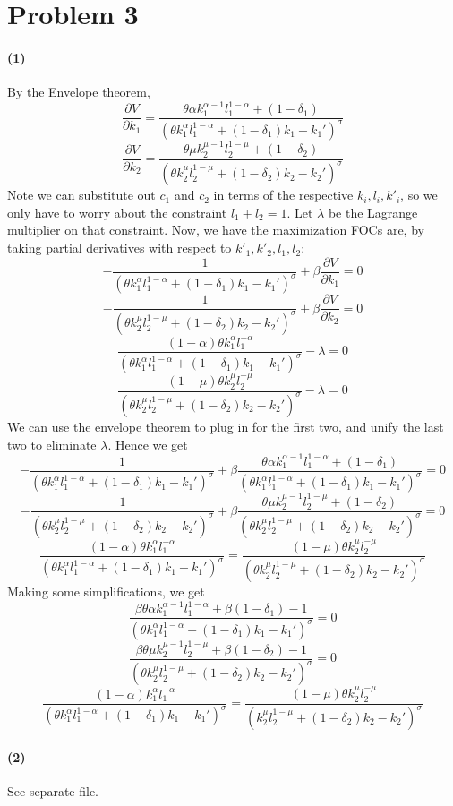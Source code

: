 \documentclass[10pt,letter]{article}
\newcommand{\problem}[1]{\section*{Problem #1}}
\newcommand{\problempart}[1]{\paragraph{#1}}
\begin{document}
\problem{3}
\problempart{(1)}
By the Envelope theorem,
\[ \frac{\partial V}{\partial k_1} = \frac{\theta \alpha k_1^{\alpha-1}l_1^{1-\alpha} + (1-\delta_1)}{(\theta k_1^\alpha l_1^{1-\alpha} + (1-\delta_1)k_1 - k_1')^\sigma} \]
\[ \frac{\partial V}{\partial k_2} = \frac{\theta \mu k_2^{\mu-1}l_2^{1-\mu} + (1-\delta_2)}{(\theta k_2^\mu l_2^{1-\mu} + (1-\delta_2)k_2 - k_2')^\sigma} \]
Note we can substitute out $c_1$ and $c_2$ in terms of the respective $k_i, l_i, k'_i$, so we only have to worry about the constraint $l_1 + l_2 = 1$. Let $\lambda$ be the Lagrange multiplier on that constraint. Now, we have the maximization FOCs are, by taking partial derivatives with respect to $k'_1, k'_2, l_1, l_2$:
\[ - \frac{1}{(\theta k_1^\alpha l_1^{1-\alpha} + (1-\delta_1)k_1 - k_1')^\sigma} + \beta \frac{\partial V}{\partial k_1} = 0 \]
\[ - \frac{1}{(\theta k_2^\mu l_2^{1-\mu} + (1-\delta_2)k_2 - k_2')^\sigma} + \beta \frac{\partial V}{\partial k_2} = 0 \]
\[ \frac{(1-\alpha)\theta k_1^\alpha l_1^{-\alpha}}{(\theta k_1^\alpha l_1^{1-\alpha} + (1-\delta_1)k_1 - k_1')^\sigma}  - \lambda = 0 \]
\[  \frac{(1-\mu)\theta k_2^\mu l_2^{-\mu}}{(\theta k_2^\mu l_2^{1-\mu} + (1-\delta_2)k_2 - k_2')^\sigma} - \lambda = 0 \]
We can use the envelope theorem to plug in for the first two, and unify the last two to eliminate $\lambda$. Hence we get
\[ - \frac{1}{(\theta k_1^\alpha l_1^{1-\alpha} + (1-\delta_1)k_1 - k_1')^\sigma} + \beta \frac{\theta \alpha k_1^{\alpha-1}l_1^{1-\alpha} + (1-\delta_1)}{(\theta k_1^\alpha l_1^{1-\alpha} + (1-\delta_1)k_1 - k_1')^\sigma} = 0 \]
\[ - \frac{1}{(\theta k_2^\mu l_2^{1-\mu} + (1-\delta_2)k_2 - k_2')^\sigma} + \beta \frac{\theta \mu k_2^{\mu-1}l_2^{1-\mu} + (1-\delta_2)}{(\theta k_2^\mu l_2^{1-\mu} + (1-\delta_2)k_2 - k_2')^\sigma} = 0 \]
\[ \frac{(1-\alpha)\theta k_1^\alpha l_1^{-\alpha}}{(\theta k_1^\alpha l_1^{1-\alpha} + (1-\delta_1)k_1 - k_1')^\sigma} = \frac{(1-\mu)\theta k_2^\mu l_2^{-\mu}}{(\theta k_2^\mu l_2^{1-\mu} + (1-\delta_2)k_2 - k_2')^\sigma} \]
Making some simplifications, we get
\[ \frac{\beta \theta \alpha k_1^{\alpha-1}l_1^{1-\alpha} + \beta (1-\delta_1) - 1}{(\theta k_1^\alpha l_1^{1-\alpha} + (1-\delta_1)k_1 - k_1')^\sigma} = 0 \]
\[ \frac{\beta \theta \mu k_2^{\mu-1}l_2^{1-\mu} + \beta (1-\delta_2) - 1}{(\theta k_2^\mu l_2^{1-\mu} + (1-\delta_2)k_2 - k_2')^\sigma} = 0 \]
\[ \frac{(1-\alpha) k_1^\alpha l_1^{-\alpha}}{(\theta k_1^\alpha l_1^{1-\alpha} + (1-\delta_1)k_1 - k_1')^\sigma} = \frac{(1-\mu)\theta k_2^\mu l_2^{-\mu}}{( k_2^\mu l_2^{1-\mu} + (1-\delta_2)k_2 - k_2')^\sigma} \]
\problempart{(2)} See separate file.
\end{document}
